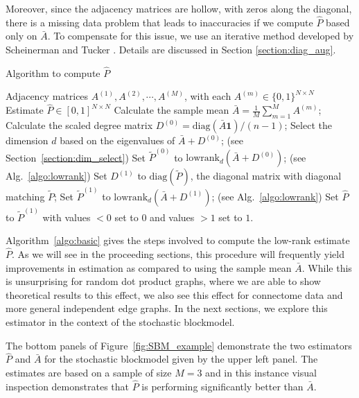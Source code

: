 \documentclass[10pt,letterpaper]{article}
\begin{document}
Moreover, since the adjacency matrices are hollow, with zeros along the diagonal, there is a missing data problem that leads to inaccuracies if we compute $\hat{P}$ based only on $\bar{A}$. 
To compensate for this issue, we use an iterative method developed by Scheinerman and Tucker \cite{scheinerman2010modeling}. 
Details are discussed in Section \ref{section:diag_aug}.


\begin{algorithm}[H]
\caption{Algorithm to compute $\hat{P}$}
\label{algo:basic}
\begin{algorithmic}[1]
\REQUIRE Adjacency matrices $A^{(1)}, A^{(2)}, \cdots, A^{(M)}$, with each $A^{(m)} \in \{0,1\}^{N \times N}$
\ENSURE Estimate $\hat{P}\in[0,1]^{N\times N}$
\STATE Calculate the sample mean $\bar{A} = \frac{1}{M}\sum\limits_{m = 1}^M A^{(m)}$;
\STATE Calculate the scaled degree matrix $D^{(0)} = \mathrm{diag}(\bar{A} \bm{1})/(n-1)$;
\STATE Select the dimension $d$ based on the eigenvalues of $\bar{A} + D^{(0)}$; (see Section~\ref{section:dim_select})
\STATE Set $\tilde{P}^{(0)}$ to $\mathrm{lowrank}_d(\bar{A} + D^{(0)})$; (see Alg.~\ref{algo:lowrank})
\STATE Set $D^{(1)}$ to $ \mathrm{diag}(\tilde{P})$, the diagonal matrix with diagonal matching $\tilde{P}$; 
\STATE Set $\tilde{P}^{(1)}$ to $\mathrm{lowrank}_d(\bar{A} + D^{(1)})$; (see Alg.~\ref{algo:lowrank})
\STATE Set $\hat{P}$ to $\tilde{P}^{(1)}$ with values $<0$ set to $0$ and values $>1$ set to $1$.
\end{algorithmic}
\end{algorithm}


Algorithm~\ref{algo:basic} gives the steps involved to compute the low-rank estimate $\hat{P}$.
As we will see in the proceeding sections, this procedure will frequently yield improvements in estimation as compared to using the sample mean $\bar{A}$.
While this is unsurprising for random dot product graphs, where we are able to show theoretical results to this effect, we also see this effect for connectome data and more general independent edge graphs.
In the next sections, we explore this estimator in the context of the stochastic blockmodel.

The bottom panels of Figure~\ref{fig:SBM_example} demonstrate the two estimators $\hat{P}$ and $\bar{A}$ for the stochastic blockmodel given by the upper left panel. 
The estimates are based on a sample of size $M=3$ and in this instance visual inspection demonstrates that $\hat{P}$ is performing significantly better than $\bar{A}$.
\end{document}
